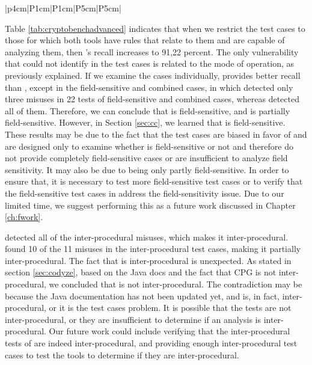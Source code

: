 \begin{table}[H]
\begin{adjustwidth}{-1em}{}
\begin{tabular}{ |p{4cm}|P{1cm}|P{1cm}|P{5cm}|P{5cm}|}
\end{tabular}
\caption{\label{tab:cryptobenchadvanced} Comparison of \codyze{} and \cognicryptsast{} analyses of \cryptoapibench's 68 advanced test cases (of all 12 threat models in Table \ref{tab:cryptobench}) that both tools have common corresponding cryptographic rules for them.}
\end{adjustwidth}
\end{table}

Table \ref{tab:cryptobenchadvanced} indicates that when we restrict the test cases to those for which both tools have rules that relate to them and are capable of analyzing them, then \codyze's recall increases to 91,22 percent. The only vulnerability that \codyze{} could not identify in the test cases is related to the mode of operation, as previously explained. If we examine the cases individually, \cognicryptsast{} provides better recall than \codyze, except in the field-sensitive and combined cases, in which \cognicryptsast{} detected only three misuses in 22 tests of field-sensitive and combined cases, whereas \codyze{} detected all of them. Therefore, we can conclude that \codyze{} is field-sensitive, and \cognicryptsast{} is partially field-sensitive. However, in Section \ref{sec:cc}, we learned that \cognicryptsast{} is field-sensitive. These results may be due to the fact that the \cryptoapibench{} test cases are biased in favor of \cryptoguard{} and are designed only to examine whether \cryptoguard{} is field-sensitive or not and therefore do not provide completely field-sensitive cases or are insufficient to analyze field sensitivity. It may also be due to \cognicryptsast{} being only partly field-sensitive. In order to ensure that, it is necessary to test more field-sensitive test cases or to verify that the field-sensitive test cases in \cryptoapibench{} address the field-sensitivity issue. Due to our limited time, we suggest performing this as a future work discussed in Chapter \ref{ch:fwork}.


\cognicryptsast{} detected all of the inter-procedural misuses, which makes it inter-procedural. \codyze{} found 10 of the 11 misuses in the inter-procedural test cases, making it partially inter-procedural. The fact that \codyze{} is inter-procedural is unexpected. As stated in section \ref{sec:codyze}, based on the \codyze{} Java docs and the fact that CPG is not inter-procedural, we concluded that \codyze{} is not inter-procedural. The contradiction may be because the \codyze{} Java documentation has not been updated yet, and \codyze{} is, in fact, inter-procedural, or it is the test cases problem. It is possible that the tests are not inter-procedural, or they are insufficient to determine if an analysis is inter-procedural. Our future work could include verifying that the inter-procedural tests of \cryptoapibench{} are indeed inter-procedural, and providing enough inter-procedural test cases to test the tools to determine if they are inter-procedural.

